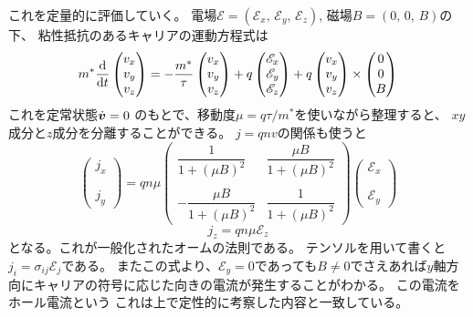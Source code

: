 \documentclass[11pt,dvipdfmx,a4paper]{jsarticle}
\numberwithin{equation}{section}
\begin{document}
これを定量的に評価していく。
電場\(\mathcal{E}=(\mathcal{E}_x,\,\mathcal{E}_y,\,\mathcal{E}_z)\), 磁場\(B=(0,\,0,\,B)\)の下、
粘性抵抗のあるキャリアの運動方程式は
\begin{equation}
	m^*\dv{t}
	\begin{pmatrix}
		v_x\\
		v_y\\
		v_z
	\end{pmatrix}
	=-\frac{m^*}{\tau}
	\begin{pmatrix}
		v_x\\
		v_y\\
		v_z
	\end{pmatrix}
	+ q
	\begin{pmatrix}
		\mathscr{E}_x\\
		\mathscr{E}_y\\
		\mathscr{E}_z
	\end{pmatrix}
	+q
	\begin{pmatrix}
		v_x\\
		v_y\\
		v_z
	\end{pmatrix} \times
	\begin{pmatrix}
		0\\
		0\\
		B
	\end{pmatrix}
\end{equation}
これを定常状態\(\dot{\vb*{v}}=0\)
のもとで、移動度\(\mu=q\tau/m^*\)を使いながら整理すると、
\(xy\)成分と\(z\)成分を分離することができる。
\(j=qnv\)の関係も使うと
\begin{equation}
	\begin{pmatrix}
		j_x\\ \\ \\ j_y
	\end{pmatrix}
	= qn\mu
	\begin{pmatrix}
		\dfrac{1}{1+(\mu B)^2} & \dfrac{\mu B}{1+(\mu B)^2}\\
		&\\
		-\dfrac{\mu B}{1+(\mu B)^2} & \dfrac{1}{1+(\mu B)^2}
	\end{pmatrix}
	\begin{pmatrix}
		\mathscr{E}_x \\ \\ \\ \mathscr{E}_y
	\end{pmatrix}
\end{equation}
\begin{equation}
	j_z = qn\mu \mathscr{E}_z
\end{equation}
となる。これが一般化されたオームの法則である。
テンソルを用いて書くと\(j_i = \sigma_{ij}\mathscr{E}_j\)である。
またこの式より、\(\mathscr{E}_y=0\)であっても\(B\neq 0\)でさえあれば\(y\)軸方向にキャリアの符号に応じた向きの電流が発生することがわかる。
この電流をホール電流という
これは上で定性的に考察した内容と一致している。
\end{document}

